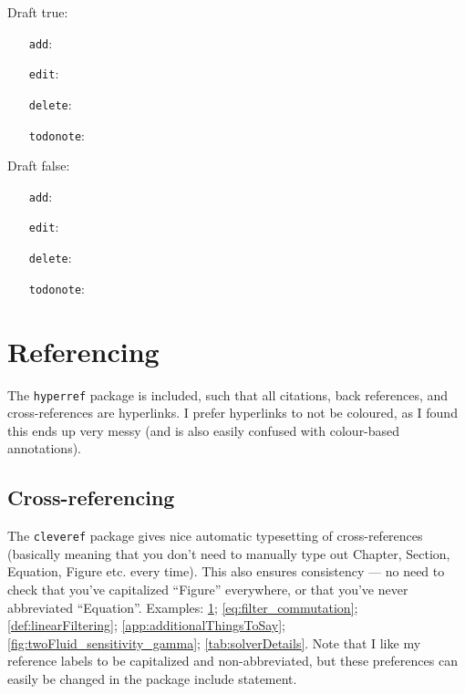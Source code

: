 \noindent Draft true: 
{\drafttrue
\begin{itemize}
    \item[\texttt{add}:] 
    \item[\texttt{edit}:] 
    \item[\texttt{delete}:] 
    \item[\texttt{todonote}:] 
\end{itemize}
}

\noindent Draft false: 
{\draftfalse
\begin{itemize}
    \item[\texttt{add}:] 
    \item[\texttt{edit}:] 
    \item[\texttt{delete}:] 
    \item[\texttt{todonote}:] 
\end{itemize}
}

\section{Referencing}\label{sec:referencing}

The \texttt{hyperref} package is included, such that all citations, back references, and cross-references are hyperlinks.
I prefer hyperlinks to not be coloured, as I found this ends up very messy (and is also easily confused with colour-based annotations).

\subsection{Cross-referencing}
The \verb!cleveref! package gives nice automatic typesetting of cross-references (basically meaning that you don't need to manually type out Chapter, Section, Equation, Figure etc. every time).
This also ensures consistency --- no need to check that you've capitalized ``Figure'' everywhere, or that you've never abbreviated ``Equation''.
Examples: \cref{sec:referencing}; \cref{eq:filter_commutation}; \cref{def:linearFiltering}; \cref{app:additionalThingsToSay}; \cref{fig:twoFluid_sensitivity_gamma}; \cref{tab:solverDetails}.
Note that I like my reference labels to be capitalized and non-abbreviated, but these preferences can easily be changed in the package include statement.

